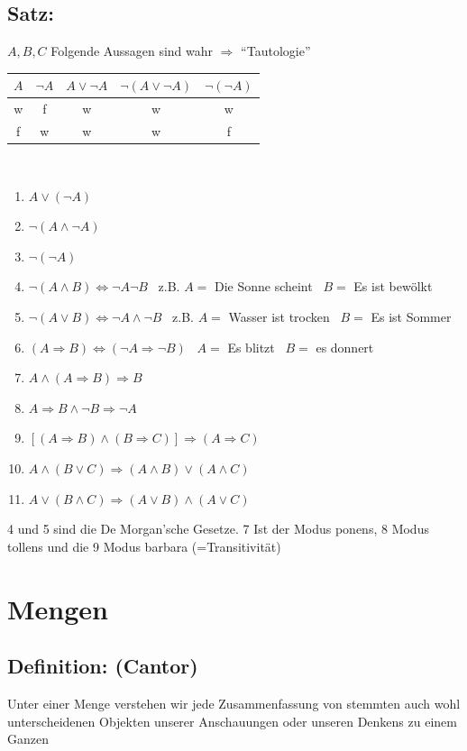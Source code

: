 \subsection{Satz:}
$A,B,C$ Folgende Aussagen sind wahr $\Rightarrow$ "`Tautologie"'
\begin{center}
\begin{tabular}{cc||ccc}
$A$ & $\neg A$ & $A \vee \neg A$ & $\neg(A\vee \neg A)$ & $\neg(\neg A)$\\ \hline
w & f & w & w & w\\
f & w & w & w & f\\
\end{tabular}
\end{center}
\quad\\
\begin{enumerate}
\item $A\vee(\neg A)$
\item $\neg (A \wedge \neg A)$
\item $\neg (\neg A)$
\item $\neg (A \wedge B) \Leftrightarrow \neg A \neg B$ \ z.B. $A=$ Die Sonne scheint \ $B=$ Es ist bewölkt
\item $\neg (A \vee B) \Leftrightarrow \neg A \wedge \neg B$ \ z.B. $A=$ Wasser ist trocken \ $B=$ Es ist Sommer
\item $(A\Rightarrow B) \Leftrightarrow (\neg A \Rightarrow \neg B)$ \ $A=$ Es blitzt \ $B=$ es donnert
\item $A \wedge (A \Rightarrow B) \Rightarrow B$
\item $A \Rightarrow B \wedge \neg B \Rightarrow \neg A$
\item $[(A\Rightarrow B) \wedge(B\Rightarrow C)]\Rightarrow(A\Rightarrow C)$
\item $A\wedge (B\vee C)\Rightarrow (A\wedge B)\vee(A\wedge C)$
\item $A \vee(B\wedge C) \Rightarrow (A\vee B) \wedge (A \vee C)$
\end{enumerate}
4 und 5 sind die De Morgan'sche Gesetze. 7 Ist der Modus ponens, 8 Modus tollens und die 9 Modus barbara (=Transitivität)\\
%
%
%
\section{Mengen}
\subsection{Definition: (Cantor)}
Unter einer Menge verstehen wir jede Zusammenfassung von stemmten auch wohl unterscheidenen Objekten unserer Anschauungen oder unseren Denkens zu einem Ganzen\\

